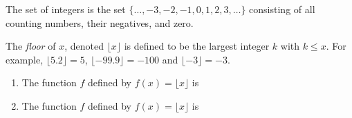 \documentclass{ximera}
\author{Kenneth Berglund}
\begin{document}
\begin{exercise}
The set of integers is the set $\{\ldots, -3, -2, -1, 0, 1, 2, 3, \ldots\}$ consisting of all counting numbers, their negatives, and zero. 

The \emph{floor} of $x$, denoted $\lfloor x \rfloor$ is defined to be the largest integer $k$ with $k \le x$. For example, $\lfloor 5.2 \rfloor = 5$, $\lfloor -99.9 \rfloor = -100$ and $\lfloor -3 \rfloor = -3$.
\begin{enumerate}
\item The function $f$ defined by $f(x) = \lfloor x \rfloor$ is 
\begin{multipleChoice}
\end{multipleChoice}

\item The function $f$ defined by $f(x) = \lfloor x \rfloor$ is 
\begin{multipleChoice}
\end{multipleChoice}
\end{enumerate}
\end{exercise}
\end{document}
